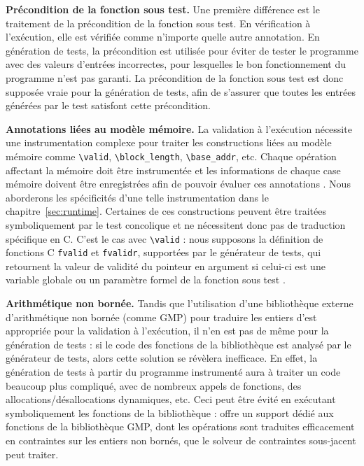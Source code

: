 \textbf{Précondition de la fonction sous test.}
Une première différence est le traitement de la précondition de la fonction sous
test.
En vérification à l'exécution, elle est vérifiée comme n'importe quelle autre
annotation.
En génération de tests, la précondition est utilisée pour éviter de tester le
programme avec des valeurs d'entrées incorrectes, pour lesquelles le bon
fonctionnement du programme n'est pas garanti.
La précondition de la fonction sous test est donc supposée vraie pour la
génération de tests, afin de s'assurer que toutes les entrées générées par le
test satisfont cette précondition.

\textbf{Annotations liées au modèle mémoire.}
La validation à l'exécution nécessite une instrumentation complexe pour traiter
les constructions \eacsl liées au modèle mémoire comme \lstinline'\valid',
\lstinline'\block_length', \lstinline'\base_addr', etc.
Chaque opération affectant la mémoire doit être instrumentée et les informations
de chaque case mémoire doivent être enregistrées afin de pouvoir évaluer ces
annotations \cite{Kosmatov/RV13}.
Nous aborderons les spécificités d'une telle instrumentation dans le
chapitre~\ref{sec:runtime}.
Certaines de ces constructions peuvent être traitées symboliquement par le test
concolique et ne nécessitent donc pas de traduction spécifique en C.
C'est le cas avec \lstinline'\valid' : nous supposons la définition de fonctions
C \lstinline'fvalid' et \lstinline'fvalidr', supportées par le générateur de
tests, qui retournent la valeur de validité du pointeur en argument si celui-ci
est une variable globale ou un paramètre formel de la fonction sous test
\cite{Chebaro/ICSSEA12}.

\textbf{Arithmétique non bornée.}
Tandis que l'utilisation d'une bibliothèque externe d'arithmétique non bornée
(comme GMP) pour traduire les entiers d'\eacsl est appropriée pour la validation
à l'exécution, il n'en est pas de même pour la génération de tests :
si le code des fonctions de la bibliothèque est analysé par le
générateur de tests, alors cette solution se révèlera inefficace.
En effet, la génération de tests à partir du programme instrumenté aura à
traiter un code beaucoup plus compliqué, avec de nombreux appels de fonctions, 
des allocations/désallocations dynamiques, etc.
Ceci peut être évité en exécutant symboliquement les fonctions de la
bibliothèque : \pathcrawler offre un support dédié aux fonctions de la
bibliothèque GMP, dont les opérations sont traduites efficacement en contraintes
sur les entiers non bornés, que le solveur de contraintes sous-jacent peut
traiter.

